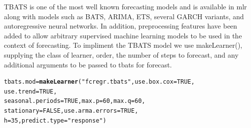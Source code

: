 \documentclass[12pt]{article}\usepackage[]{graphicx}\usepackage[]{color}
\makeatletter
\newcommand{\hlnum}[1]{\textcolor[rgb]{0.686,0.059,0.569}{#1}}%
\newcommand{\hlstr}[1]{\textcolor[rgb]{0.192,0.494,0.8}{#1}}%
\newcommand{\hlstd}[1]{\textcolor[rgb]{0.345,0.345,0.345}{#1}}%
\newcommand{\hlkwb}[1]{\textcolor[rgb]{0.69,0.353,0.396}{#1}}%
\newcommand{\hlkwc}[1]{\textcolor[rgb]{0.333,0.667,0.333}{#1}}%
\newcommand{\hlkwd}[1]{\textcolor[rgb]{0.737,0.353,0.396}{\textbf{#1}}}%
\newenvironment{kframe}{%
 \def\at@end@of@kframe{}%
 \ifinner\ifhmode%
  \def\at@end@of@kframe{\end{minipage}}%
  \begin{minipage}{\columnwidth}%
 \fi\fi%
 \def\FrameCommand##1{\hskip\@totalleftmargin \hskip-\fboxsep
 \colorbox{shadecolor}{##1}\hskip-\fboxsep
     \hskip-\linewidth \hskip-\@totalleftmargin \hskip\columnwidth}%
 \MakeFramed {\advance\hsize-\width
   \@totalleftmargin\z@ \linewidth\hsize
   \@setminipage}}%
 {\par\unskip\endMakeFramed%
 \at@end@of@kframe}
\newenvironment{knitrout}{}{} %
\theoremstyle{definition}
\newcommand\code{\@codex}
\def\@codex#1{{\normalfont\ttfamily\hyphenchar\font=-1 #1}}
\newcommand{\pkg}[1]{{\fontseries{b}\selectfont #1}}
\makeatother
\begin{document}

TBATS is one of the most well known forecasting models and is available in mlr along with models such as BATS, ARIMA, ETS, several GARCH variants, and autoregressive neural networks. In addition, preprocessing features have been added to allow arbitrary supervised machine learning models to be used in the context of forecasting. To impliment the TBATS model we use  \code{makeLearner()}, supplying the class of learner, order, the number of steps to forecast, and any additional arguments to be passed to \code{tbats} for \pkg{forecast}. 

\singlespacing
\begin{knitrout}
\color{fgcolor}\begin{kframe}
\begin{alltt}
\hlstd{tbats.mod} \hlkwb{=}\hlkwd{makeLearner}\hlstd{(}\hlstr{"fcregr.tbats"}\hlstd{,} \hlkwc{use.box.cox} \hlstd{=} \hlnum{TRUE}\hlstd{,}
                      \hlkwc{use.trend} \hlstd{=} \hlnum{TRUE}\hlstd{,}
                      \hlkwc{seasonal.periods} \hlstd{=} \hlnum{TRUE}\hlstd{,} \hlkwc{max.p} \hlstd{=} \hlnum{60}\hlstd{,} \hlkwc{max.q} \hlstd{=} \hlnum{60}\hlstd{,}
                      \hlkwc{stationary} \hlstd{=} \hlnum{FALSE}\hlstd{,} \hlkwc{use.arma.errors} \hlstd{=} \hlnum{TRUE}\hlstd{,}
                      \hlkwc{h} \hlstd{=} \hlnum{35}\hlstd{,} \hlkwc{predict.type} \hlstd{=} \hlstr{"response"}\hlstd{)}
\end{alltt}
\end{kframe}
\end{knitrout}
\doublespacing
\end{document}
